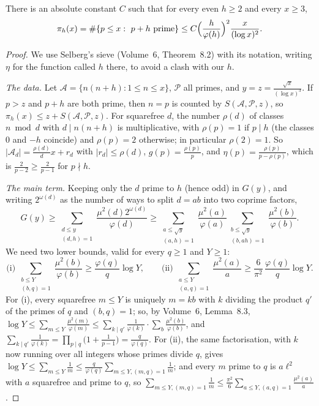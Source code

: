 \begin{proposition}\label{conjectures:prop:pairs}
There is an absolute constant $C$ such that for every even $h\ge2$ and every $x\ge3$,
\[
\pi_h(x)=\#\{p\le x:\ p+h\text{ prime}\}\le C\Bigl(\frac h{\varphi(h)}\Bigr)^2\frac x{(\log x)^2}.
\]
\end{proposition}
\begin{proof}
We use Selberg's sieve (Volume~6, Theorem~8.2) with its notation, writing $\eta$ for the function called $h$ there, to avoid a clash with our $h$.

\emph{The data.} Let $\mathcal A=\{n(n+h):1\le n\le x\}$, $\mathcal P$ all primes, and $y=z=\frac{\sqrt x}{(\log x)^3}$. If $p>z$ and $p+h$ are both prime, then
$n=p$ is counted by $S(\mathcal A,\mathcal P,z)$, so $\pi_h(x)\le z+S(\mathcal A,\mathcal P,z)$. For squarefree $d$, the number $\rho(d)$ of classes $n\bmod d$ with
$d\mid n(n+h)$ is multiplicative, with $\rho(p)=1$ if $p\mid h$ (the classes $0$ and $-h$ coincide) and $\rho(p)=2$ otherwise; in particular $\rho(2)=1$. So
$|\mathcal A_d|=\frac{\rho(d)}dx+r_d$ with $|r_d|\le\rho(d)$, $g(p)=\frac{\rho(p)}p$, and $\eta(p)=\frac{\rho(p)}{p-\rho(p)}$, which is $\frac2{p-2}\ge\frac2{p-1}$ for
$p\nmid h$.

\emph{The main term.} Keeping only the $d$ prime to $h$ (hence odd) in $G(y)$, and writing $2^{\omega(d)}$ as the number of ways to split $d=ab$ into
two coprime factors,
\[
G(y)\ge\sum_{\substack{d\le y\\(d,h)=1}}\frac{\mu^2(d)2^{\omega(d)}}{\varphi(d)}\ge\sum_{\substack{a\le\sqrt y\\(a,h)=1}}\frac{\mu^2(a)}{\varphi(a)}\sum_{\substack{b\le\sqrt y\\(b,ah)=1}}\frac{\mu^2(b)}{\varphi(b)}.
\]
We need two lower bounds, valid for every $q\ge1$ and $Y\ge1$:
\[
\text{(i)}\ \sum_{\substack{b\le Y\\(b,q)=1}}\frac{\mu^2(b)}{\varphi(b)}\ge\frac{\varphi(q)}q\log Y,\qquad\text{(ii)}\ \sum_{\substack{a\le Y\\(a,q)=1}}\frac{\mu^2(a)}a\ge\frac6{\pi^2}\,\frac{\varphi(q)}q\log Y.
\]
For (i), every squarefree $m\le Y$ is uniquely $m=kb$ with $k$ dividing the product $q'$ of the primes of $q$ and $(b,q)=1$; so, by Volume~6, Lemma~8.3,
$\log Y\le\sum_{m\le Y}\frac{\mu^2(m)}{\varphi(m)}\le\sum_{k\mid q'}\frac1{\varphi(k)}\cdot\sum_{b}\frac{\mu^2(b)}{\varphi(b)}$, and
$\sum_{k\mid q'}\frac1{\varphi(k)}=\prod_{p\mid q}\bigl(1+\frac1{p-1}\bigr)=\frac q{\varphi(q)}$. For (ii), the same factorisation, with $k$ now running over all
integers whose primes divide $q$, gives $\log Y\le\sum_{m\le Y}\frac1m\le\frac q{\varphi(q)}\sum_{m\le Y,(m,q)=1}\frac1m$; and every $m$ prime to $q$ is $a\ell^2$ with $a$
squarefree and prime to $q$, so $\sum_{m\le Y,(m,q)=1}\frac1m\le\frac{\pi^2}6\sum_{a\le Y,(a,q)=1}\frac{\mu^2(a)}a$.


\end{proof}
